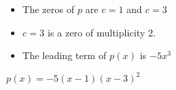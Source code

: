 {\begin{itemize}

\item The zeros of $p$ are $c=1$ and $c = 3$
\item $c=3$ is a zero of multiplicity 2.
\item The leading term of $p(x)$ is $-5x^3$

\end{itemize}}
{$p(x)= -5(x-1)(x-3)^2$}